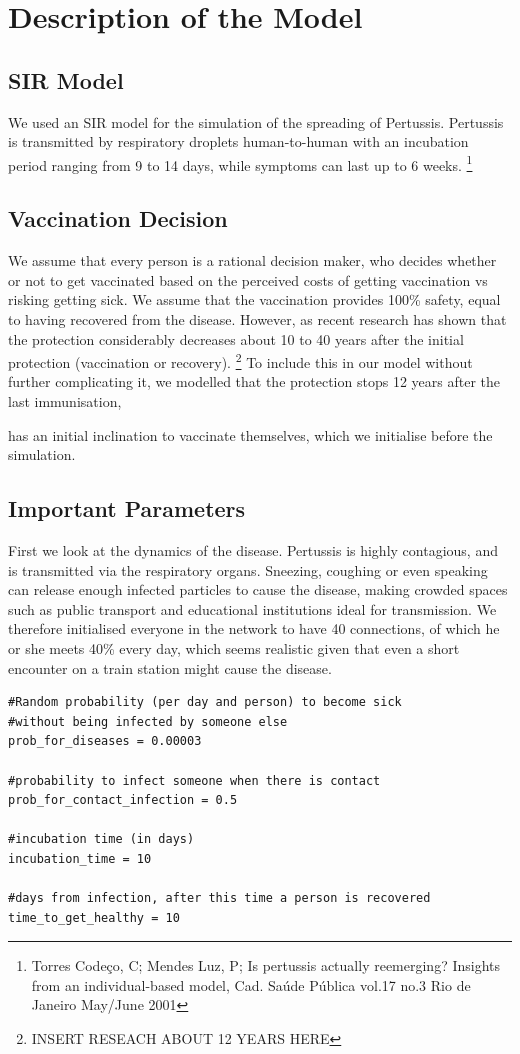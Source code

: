 \documentclass[11pt]{article}
\begin{document}
\section{Description of the Model}

\subsection{SIR Model}

We used an SIR model for the simulation of the spreading of Pertussis. Pertussis is transmitted by respiratory droplets human-to-human with an incubation period ranging from 9 to 14 days, while symptoms can last up to 6 weeks. \footnote{Torres Codeço, C; Mendes Luz, P; Is pertussis actually reemerging? Insights from an individual-based model, Cad. Saúde Pública vol.17 no.3 Rio de Janeiro May/June 2001}

\subsection{Vaccination Decision}

We assume that every person is a rational decision maker, who decides whether or not to get vaccinated based on the perceived costs of getting vaccination vs risking getting sick. We assume that the vaccination provides 100\% safety, equal to having recovered from the disease. However, as recent research has shown that the protection considerably decreases about 10 to 40 years after the initial protection (vaccination or recovery). \footnote{INSERT RESEACH ABOUT 12 YEARS HERE} To include this in our model without further complicating it, we modelled that the protection stops 12 years after the last immunisation, 

has an initial inclination to vaccinate themselves, which we initialise before the simulation. 

\subsection{Important Parameters}
First we look at the dynamics of the disease. Pertussis is highly contagious, and is transmitted via the respiratory organs. Sneezing, coughing or even speaking can release enough infected particles to cause the disease, making crowded spaces such as public transport and educational institutions ideal for transmission. We therefore initialised everyone in the network to have 40 connections, of which he or she meets 40\% every day, which seems realistic given that even a short encounter on a train station might cause the disease. 
\begin{lstlisting}
#Random probability (per day and person) to become sick 
#without being infected by someone else
prob_for_diseases = 0.00003 

#probability to infect someone when there is contact
prob_for_contact_infection = 0.5 

#incubation time (in days)
incubation_time = 10
 
#days from infection, after this time a person is recovered
time_to_get_healthy = 10 
\end{lstlisting}
\end{document}
